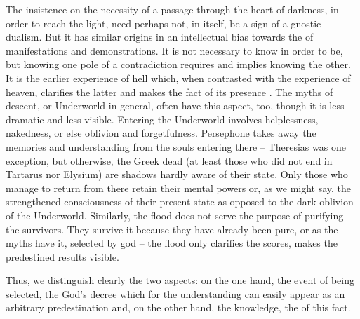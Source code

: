 The insistence on the necessity of a passage through the heart of darkness, in
order to reach the light, need perhaps not, in itself, be a sign of a gnostic
dualism. But it has similar origins in an intellectual bias towards the
 of  manifestations and demonstrations.  It is not
necessary to know in order to be, but knowing one pole of a contradiction
requires and implies knowing the other.  It is the earlier experience of hell
which, when contrasted with the experience of heaven, clarifies the latter and
makes the fact of its presence .  The myths of descent, or
Underworld in general, often have this aspect, too, though it is less dramatic
and less visible. Entering the Underworld involves helplessness, nakedness, or
else oblivion and forgetfulness.  Persephone takes away the memories and
understanding from the souls entering there -- Theresias was one exception, but
otherwise, the Greek dead (at least those who did not end in Tartarus nor
Elysium) are shadows hardly aware of their state.  Only those who manage to
return from there retain their mental powers or, as we might say, the
strengthened consciousness of their present state as opposed to the dark
oblivion of the Underworld.  Similarly, the flood does not serve the purpose of
purifying the survivors.  They survive it because they have already been pure,
or as the myths have it, selected by god -- the flood only clarifies the scores,
makes the predestined results visible.

Thus, we distinguish clearly the two aspects: on the one hand, the
 event of being selected, the God's decree which for the
 understanding can easily appear as an arbitrary predestination
and, on the other hand, the  knowledge, the 
 of this fact.

